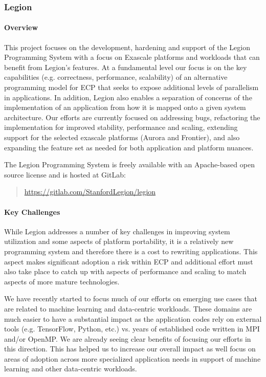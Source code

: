 \subsubsection{ Legion}

\paragraph{Overview}
This project focuses on the development, hardening and support of the
Legion Programming System with a focus on Exascale platforms and workloads
that can benefit from Legion's features.  At a fundamental level our focus 
is on the key capabilities (e.g. correctness, performance, scalability) of 
an alternative programming model for ECP that seeks to expose additional levels
of parallelism in applications.  In addition, Legion also enables a separation of 
concerns of the implementation of an application from how it is mapped onto a 
given system architecture.  Our efforts are currently focused on addressing bugs, 
refactoring the implementation for improved stability, performance and scaling,
extending support for the selected exascale platforms (Aurora and Frontier), and
also expanding the feature set as needed for both application and platform nuances. 

The Legion Programming System is freely available with an Apache-based
open source license and is hosted at GitLab:

\begin{quote} 
  \url{https://gitlab.com/StanfordLegion/legion}
\end{quote}

\paragraph{Key Challenges}
While Legion addresses a number of key challenges in improving system
utilization and some aspects of platform portability, it is a
relatively new programming system and therefore there is a cost to
rewriting applications.  This aspect makes significant adoption a risk
within ECP and additional effort must also take place to catch up with
aspects of performance and scaling to match aspects of more mature
technologies.

We have recently started to focus much of our efforts on emerging use 
cases that are related to machine learning and data-centric workloads.
These domains are much easier to have a substantial impact as the application
codes rely on external tools (e.g. TensorFlow, Python, etc.) vs. years of 
established code written in MPI and/or OpenMP.  We are already seeing clear 
benefits of focusing our efforts in this direction. This has helped us to 
increase our overall impact as well focus on areas of adoption 
across more specialized application needs in support of machine learning 
and other data-centric workloads. 

